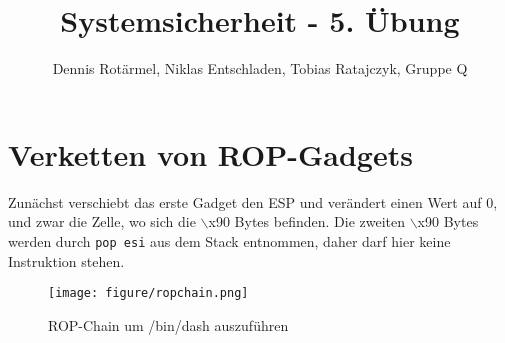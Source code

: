 \documentclass[]{scrreprt}
\title{Systemsicherheit - 5. Übung}
\author{Dennis Rotärmel, Niklas Entschladen, Tobias Ratajczyk, Gruppe Q}
\begin{document}
\maketitle
\chapter{Verketten von ROP-Gadgets}
Zunächst verschiebt das erste Gadget den ESP und verändert einen Wert auf 0, und zwar die Zelle, wo sich die $\backslash$x90 Bytes befinden. Die zweiten $\backslash$x90 Bytes werden durch \texttt{pop esi} aus dem Stack entnommen, daher darf hier keine Instruktion stehen.
\begin{figure}[h]
	\centering
	\texttt{[image: figure/ropchain.png]}
	\caption{ROP-Chain um /bin/dash auszuführen}
\end{figure}
\end{document}
